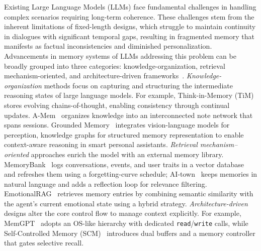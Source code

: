 \documentclass[11pt]{article}
\begin{document}
Existing Large Language Models (LLMs) face fundamental challenges in handling complex scenarios requiring long-term coherence. These challenges stem from the inherent limitations of fixed-length designs, which struggle to maintain continuity in dialogues with significant temporal gaps, resulting in fragmented memory that manifests as factual inconsistencies and diminished personalization. 
Advancements in memory systems of LLMs addressing this problem can be broadly grouped into three categories: knowledge-organization, retrieval mechanism-oriented, and architecture-driven frameworks~\cite{zhang2024survey,wu2025human,du2025rethinking}.
\emph{Knowledge-organization} methods focus on capturing and structuring the intermediate reasoning states of large language models. For example, Think-in-Memory (TiM)~\cite{liu2023think} stores evolving chains-of-thought, enabling consistency through continual updates. A-Mem~\cite{xu2025mem} organizes knowledge into an interconnected note network that spans sessions. Grounded Memory~\cite{ocker2025ground} integrates vision-language models for perception, knowledge graphs for structured memory representation to enable context-aware reasoning in smart personal assistants.
\emph{Retrieval mechanism–oriented} approaches enrich the model with an external memory library. MemoryBank~\cite{zhong2024memorybank} logs conversations, events, and user traits in a vector database and refreshes them using a forgetting-curve schedule; AI-town~\cite{aitown2024} keeps memories in natural language and adds a reflection loop for relevance filtering. EmotionalRAG~\cite{emotional} retrieves memory entries by combining semantic similarity with the agent’s current emotional state using a hybrid strategy.
\emph{Architecture-driven} designs alter the core control flow to manage context explicitly. For example, MemGPT~\cite{packer2023memgpt} adopts an OS-like hierarchy with dedicated \texttt{read}/\texttt{write} calls, while Self-Controlled Memory (SCM)~\cite{wang2025scmenhancinglargelanguage} introduces dual buffers and a memory controller that gates selective recall.

\end{document}
